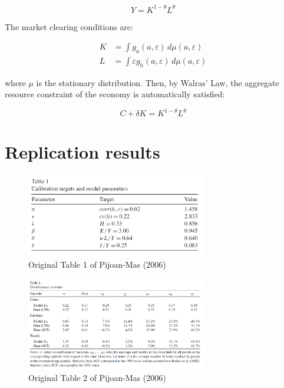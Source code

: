 \documentclass[12pt]{article}
\begin{document}
	\begin{equation*}
		Y = K^{1 - \theta} L^{\theta}
	\end{equation*}
	
	The market clearing conditions are:
	
	\begin{align*}
		K &= \int g_a(a, \varepsilon) \, d\mu(a, \varepsilon) \\
		L &= \int \varepsilon g_h(a, \varepsilon) \, d\mu(a, \varepsilon)
	\end{align*}
	
	where $\mu$ is the stationary distribution. Then, by Walras' Law, the aggregate resource constraint of the economy is automatically satisfied:
	
	\begin{equation*}
		C + \delta K = K^{1 - \theta} L^{\theta}
	\end{equation*}
	

\section*{Replication results}

\begin{figure}[!htbp]
	\centering
	\includegraphics[width=0.7\textwidth]{original_table1}
	\caption{Original Table 1 of Pijoan-Mas (2006)}
\end{figure}



\begin{figure}[!htbp]
	\centering
	\includegraphics[width=0.7\textwidth]{original_table2}
	\caption{Original Table 2 of Pijoan-Mas (2006)}
\end{figure}
\end{document}

